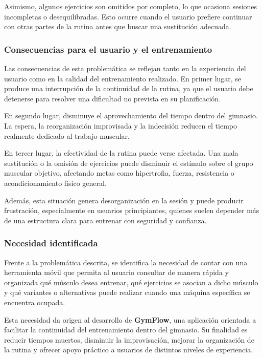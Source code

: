 Asimismo, algunos ejercicios son omitidos por completo, lo que ocasiona sesiones incompletas o desequilibradas. Esto ocurre cuando el usuario prefiere continuar con otras partes de la rutina antes que buscar una sustitución adecuada.

\subsubsection{Consecuencias para el usuario y el entrenamiento}

Las consecuencias de esta problemática se reflejan tanto en la experiencia del usuario como en la calidad del entrenamiento realizado. En primer lugar, se produce una interrupción de la continuidad de la rutina, ya que el usuario debe detenerse para resolver una dificultad no prevista en su planificación.

En segundo lugar, disminuye el aprovechamiento del tiempo dentro del gimnasio. La espera, la reorganización improvisada y la indecisión reducen el tiempo realmente dedicado al trabajo muscular.

En tercer lugar, la efectividad de la rutina puede verse afectada. Una mala sustitución o la omisión de ejercicios puede disminuir el estímulo sobre el grupo muscular objetivo, afectando metas como hipertrofia, fuerza, resistencia o acondicionamiento físico general.

Además, esta situación genera desorganización en la sesión y puede producir frustración, especialmente en usuarios principiantes, quienes suelen depender más de una estructura clara para entrenar con seguridad y confianza.

\subsubsection{Necesidad identificada}

Frente a la problemática descrita, se identifica la necesidad de contar con una herramienta móvil que permita al usuario consultar de manera rápida y organizada qué músculo desea entrenar, qué ejercicios se asocian a dicho músculo y qué variantes o alternativas puede realizar cuando una máquina específica se encuentra ocupada.

Esta necesidad da origen al desarrollo de \textbf{GymFlow}, una aplicación orientada a facilitar la continuidad del entrenamiento dentro del gimnasio. Su finalidad es reducir tiempos muertos, disminuir la improvisación, mejorar la organización de la rutina y ofrecer apoyo práctico a usuarios de distintos niveles de experiencia.

